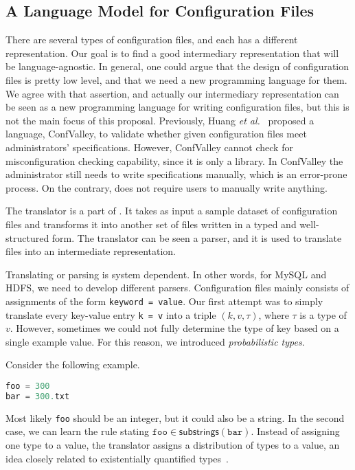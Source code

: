 \subsection{A Language Model for Configuration Files}
\label{sec:lang}

There are several types of configuration 
files, and each has a different representation. Our goal is to find a good 
intermediary representation that will be language-agnostic. In general,
one could argue that the design of configuration files is pretty low 
level, and that we need a new programming language for them. We agree with 
that assertion, and actually our intermediary representation can be seen
as a new programming language for writing configuration files, but this
is not the main focus of this proposal. Previously, Huang {\em et al.}~\cite{huang15confvalley} proposed a 
language, ConfValley, to validate 
whether given configuration files meet administrators' specifications. 
However, ConfValley cannot check for misconfiguration checking 
capability, since it is only a library. In ConfValley the administrator 
still needs to write specifications manually, which is an error-prone
process. On the contrary, \app does not require users to manually
write anything.

The translator is a part of \app. It takes as input a sample dataset of configuration files and transforms it into another set of files written in a
typed and well-structured form.
The translator can be seen a parser, and it is
used to translate files into an intermediate representation.

Translating or parsing is system dependent. In other words, for MySQL
and HDFS, we need to develop different parsers.
Configuration files mainly consists of assignments of the form {\tt {keyword = value}}. Our first attempt was to simply
translate every key-value entry {\tt {k = v}} into a triple $(k, v, \tau)$, where $\tau$ is a type of 
$v$. However, sometimes we could not fully determine the type of key 
based on a single example value. For this reason, we introduced {\emph {probabilistic types}}.

Consider the following example.
\begin{lstlisting}[language=C, xleftmargin=.01\textwidth]
foo = 300
bar = 300.txt
\end{lstlisting} 
Most likely {\tt foo} should be an integer, but it could also be a string.
In the second case, we can learn the rule stating 
$ \texttt{foo} \in \textsf{substrings}(\texttt{bar})$. 
Instead of assigning one type to a value, the translator assigns a distribution of types 
to a value, an idea closely related to existentially quantified 
types~\cite{Launchbury93lazyfunctional}. 

